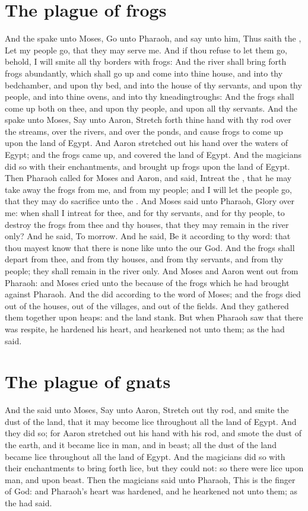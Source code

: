 \section*{The plague of frogs}
\begin{biblechapter} %
\verse And the \LORD spake unto Moses, Go unto Pharaoh, and say unto him, Thus saith the \LORD, Let my people go, that they may serve me.
\verse And if thou refuse to let them go, behold, I will smite all thy borders with frogs:
\verse And the river shall bring forth frogs abundantly, which shall go up and come into thine house, and into thy bedchamber, and upon thy bed, and into the house of thy servants, and upon thy people, and into thine ovens, and into thy kneadingtroughs:
\verse And the frogs shall come up both on thee, and upon thy people, and upon all thy servants.
\verse And the \LORD spake unto Moses, Say unto Aaron, Stretch forth thine hand with thy rod over the streams, over the rivers, and over the ponds, and cause frogs to come up upon the land of Egypt.
\verse And Aaron stretched out his hand over the waters of Egypt; and the frogs came up, and covered the land of Egypt.
\verse And the magicians did so with their enchantments, and brought up frogs upon the land of Egypt.
\verse Then Pharaoh called for Moses and Aaron, and said, Intreat the \LORD, that he may take away the frogs from me, and from my people; and I will let the people go, that they may do sacrifice unto the \LORD.
\verse And Moses said unto Pharaoh, Glory over me: when shall I intreat for thee, and for thy servants, and for thy people, to destroy the frogs from thee and thy houses, that they may remain in the river only?
\verse And he said, To morrow. And he said, Be it according to thy word: that thou mayest know that there is none like unto the \LORD our God.
\verse And the frogs shall depart from thee, and from thy houses, and from thy servants, and from thy people; they shall remain in the river only.
\verse And Moses and Aaron went out from Pharaoh: and Moses cried unto the \LORD because of the frogs which he had brought against Pharaoh.
\verse And the \LORD did according to the word of Moses; and the frogs died out of the houses, out of the villages, and out of the fields.
\verse And they gathered them together upon heaps: and the land stank.
\verse But when Pharaoh saw that there was respite, he hardened his heart, and hearkened not unto them; as the \LORD had said.
\section*{The plague of gnats}
\verse And the \LORD said unto Moses, Say unto Aaron, Stretch out thy rod, and smite the dust of the land, that it may become lice throughout all the land of Egypt.
\verse And they did so; for Aaron stretched out his hand with his rod, and smote the dust of the earth, and it became lice in man, and in beast; all the dust of the land became lice throughout all the land of Egypt.
\verse And the magicians did so with their enchantments to bring forth lice, but they could not: so there were lice upon man, and upon beast.
\verse Then the magicians said unto Pharaoh, This is the finger of God: and Pharaoh's heart was hardened, and he hearkened not unto them; as the \LORD had said.

\end{biblechapter}
